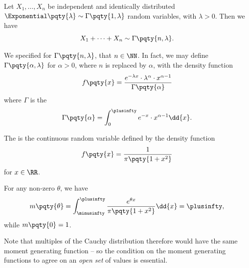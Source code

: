 \begin{example}
    \label{ex:sum-exponential}%
    Let \(X_1, \ldots, X_n\) be independent and identically distributed \(\Exponential\pqty{\lambda} \sim \Gamma\pqty{1, \lambda}\) random variables, with \(\lambda > 0\). Then we have
    \[
        X_1 + \cdots + X_n \sim \Gamma\pqty{n, \lambda}.
    \]
\end{example}

\begin{remark}
    We specified for \(\Gamma\pqty{n, \lambda}\), that \(n \in \NN\). In fact, we may define \(\Gamma\pqty{\alpha, \lambda}\) for \(\alpha > 0\), where \(n\) is replaced by \(\alpha\), with the density function
    \[
        f\pqty{x} = \frac{e^{-\lambda x} \cdot \lambda^{\alpha} \cdot x^{\alpha - 1}}{\Gamma\pqty{\alpha}}
    \]
    where \(\Gamma\) is the 
    \[
        \Gamma\pqty{\alpha} = \int_{0}^{\plusinfty} e^{-x} \cdot x^{\alpha - 1} \dd{x}.
    \]
\end{remark}

\begin{definition}
    The  is the continuous random variable defined by the density function
    \[
        f\pqty{x} = \frac{1}{\pi \pqty{1 + x^2}}
    \]
    for \(x \in \RR\).
\end{definition}

\begin{remark}
    For any non-zero \(\theta\), we have
    \[
        m\pqty{\theta} = \int_{\minusinfty}^{\plusinfty} \frac{e^{\theta x}}{\pi \pqty{1 + x^2}} \dd{x} = \plusinfty,
    \]
    while \(m\pqty{0} = 1\).
\end{remark}

Note that multiples of the Cauchy distribution therefore would have the same moment generating function -- so the condition on the moment generating functions to agree on an \emph{open set} of values is essential.

